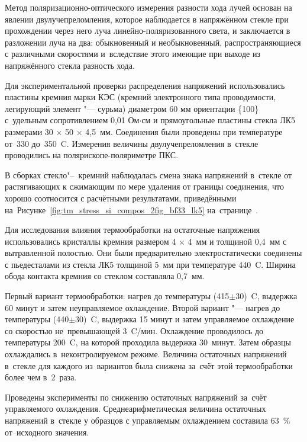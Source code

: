 Метод поляризационно-оптического измерения разности хода лучей основан
на явлении двулучепреломления, которое наблюдается в напряжённом
стекле при прохождении через него луча линейно-поляризованного света,
и заключается в разложении луча на два: обыкновенный и необыкновенный,
распространяющиеся с различными скоростями и~вследствие этого имеющие
при выходе из напряжённого стекла разность хода.

Для экспериментальной проверки распределения напряжений
использовались пластины кремния марки КЭС (кремний электронного типа
проводимости, легирующий элемент "--- сурьма) диаметром 60 мм
ориентации \{100\} с~удельным сопротивлением 0,01 Ом$\cdot$см и
прямоугольные пластины стекла ЛК5 размерами 30\(\,\times\,\)50\(\,\times\,\)4,5~мм. Соединения были проведены при температуре от~330
до~350~{\textdegree}C. Измерения величины двулучепреломления в~стекле
проводились на полярископе\nb-поляриметре ПКС.

В сборках стекло"--~кремний наблюдалась смена знака напряжений в~стекле от
растягивающих к сжимающим по мере удаления от границы соединения, что хорошо
соотносится с расчётными результатами, приведёнными
на~Рисунке~\ref{fig:tm_stress_si_compos_2fig_bf33_lk5}
на~странице~\pageref{fig:tm_stress_si_compos_2fig_bf33_lk5}.

Для исследования влияния
термообработки на остаточные напряжения
использовались кристаллы кремния
размером 4\(\,\times\,\)4~мм и толщиной 0,4~мм с вытравленной полостью. Они были
предварительно электростатически соединены с пьедесталами из стекла ЛК5 толщиной
5~мм при температуре 440~{\textdegree}C. Ширина обода контакта
кремния со стеклом составляла 0,7~мм.

Первый вариант термообработки: нагрев до температуры
(415\(\pm\)30)~{\textdegree}C, выдержка 60 минут и затем неуправляемое охлаждение.
Второй вариант "--- нагрев до температуры
(440\(\pm\)30)~{\textdegree}C, выдержка 15 минут и затем управляемое охлаждение со
скоростью не~превышающей 3~{\textdegree}C/мин. Охлаждение проводилось до
температуры 200~{\textdegree}C, на которой проходила выдержка 30~минут. Затем
образцы охлаждались в~неконтролируемом режиме.
Величина остаточных напряжений в~стекле для каждого
из~вариантов была снижена за~счёт этой термообработки более чем в~2~раза.

Проведены эксперименты по снижению остаточных напряжений
за~счёт управляемого охлаждения.
Среднеарифметическая величина остаточных напряжений в~стекле
у образцов с управляемым охлаждением составила
63~\% от~исходного значения.

